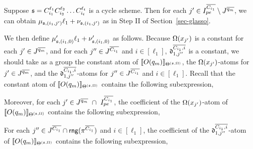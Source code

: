 Suppose ${\mathfrak{s} }=C_{i_1}^{\ell_1} C^{\ell_2}_{i_2} \dots C^{\ell_t}_{i_t}$ is a cycle scheme. Then for each $j' \in  I^{\overline{C_{i_1}}}_{pe} \setminus J^{\overline{q_m}}$, we can obtain $\mu_{{\mathfrak{s} }, (i_1,j')} \ell_1 + \nu_{{\mathfrak{s} }, (i_1,j')}$ as in Step II of Section~\ref{sec-glasso}. 

We then define $\mu'_{{\mathfrak{s} },(i_1,0)} \ell_1 + \nu'_{{\mathfrak{s} },(i_1,0)}$ as follows. Because $\Omega(x_{j'})$ is a constant for each $j' \in J^{\overline{q_m}}$, and for each $j'' \in J^{\overline{C_{i_1}}}$ and $i \in [\ell_1]$, $\mathfrak{d}^{\overline{C_{i_1}, i}}_{1, j''}$ is a constant, we should take as a group the constant atom of  $\llbracket O(q_m)\rrbracket_{\Theta^{({\mathfrak{s} },\Omega)}}$, the $\Omega(x_{j'})$-atoms for $j' \in J^{\overline{q_m}}$, and the $\mathfrak{d}^{\overline{C_{i_1}, i}}_{1, j''}$-atoms for $j'' \in J^{\overline{C_{i_1}}}$ and $i \in [\ell_1]$.
%
Recall that the constant atom of $\llbracket O(q_m)\rrbracket_{\Theta^{({\mathfrak{s} },\Omega)}}$ contains the following  subexpression,
\begin{center}
	\vspace{-0.2cm}
\end{center}
Moreover, for each $j' \in  J^{\overline{q_m}}\ \cap\ I^{\overline{C_{i_1}}}_{pe}$, the coefficient of the $\Omega(x_{j'})$-atom of $\llbracket O(q_m)\rrbracket_{\Theta^{({\mathfrak{s} },\Omega)}}$ contains the following subexpression, 
\begin{center}
\end{center}

For each $j'' \in J^{\overline{C_{i_1}}} \cap \mathsf{rng}(\pi^{\overline{C_{i_1}}})$ and $i \in [\ell_1]$, the coefficient of the $\mathfrak{d}^{\overline{C_{i_1}, i}}_{1, j''}$-atom of $\llbracket O(q_m)\rrbracket_{\Theta^{({\mathfrak{s} },\Omega)}}$ contains the following subexpression, 
\begin{center}
\end{center}

